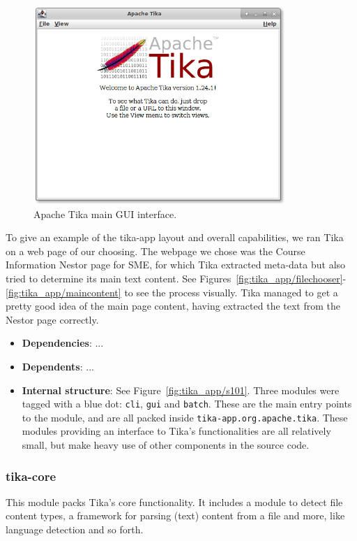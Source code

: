 \documentclass{article}
\begin{document}
\begin{figure}[ht]
    \centering
    \includegraphics[width=0.85\textwidth]{report/images/tika_app/main.png}
    \caption{Apache Tika main GUI interface.}
    \label{fig:tika_app/main}
\end{figure}

To give an example of the tika-app layout and overall capabilities, we ran Tika on a web page of our choosing. The webpage we chose was the Course Information Nestor page for SME, for which Tika extracted meta-data but also tried to determine its main text content. See Figures~\ref{fig:tika_app/filechooser}-\ref{fig:tika_app/maincontent} to see the process visually. Tika managed to get a pretty good idea of the main page content, having extracted the text from the Nestor page correctly.

\begin{itemize}
    \item \textbf{Dependencies}: ...
    \item \textbf{Dependents}: ...
    \item \textbf{Internal structure}: See Figure~\ref{fig:tika_app/s101}. Three modules were tagged with a blue dot: \texttt{cli}, \texttt{gui} and \texttt{batch}. These are the main entry points to the module, and are all packed inside \texttt{tika-app.org.apache.tika}. These modules providing an interface to Tika's functionalities are all relatively small, but make heavy use of other components in the source code.
\end{itemize}

\subsubsection{tika-core}
This module packs Tika's core functionality. It includes a module to detect file content types, a framework for parsing (text) content from a file and more, like language detection and so forth.
\end{document}
